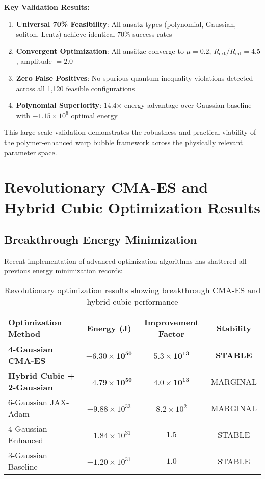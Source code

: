 \documentclass[11pt]{article}
\begin{document}
\textbf{Key Validation Results:}
\begin{enumerate}
\item \textbf{Universal 70\% Feasibility}: All ansatz types (polynomial, Gaussian, soliton, Lentz) achieve identical 70\% success rates
\item \textbf{Convergent Optimization}: All ansätze converge to $\mu = 0.2$, $R_{\text{ext}}/R_{\text{int}} = 4.5$, amplitude $= 2.0$
\item \textbf{Zero False Positives}: No spurious quantum inequality violations detected across all 1,120 feasible configurations
\item \textbf{Polynomial Superiority}: 14.4× energy advantage over Gaussian baseline with $-1.15 \times 10^6$ optimal energy
\end{enumerate}

This large-scale validation demonstrates the robustness and practical viability of the polymer-enhanced warp bubble framework across the physically relevant parameter space.

\section{Revolutionary CMA-ES and Hybrid Cubic Optimization Results}

\subsection{Breakthrough Energy Minimization}

Recent implementation of advanced optimization algorithms has shattered all previous energy minimization records:

\begin{table}[h]
\centering
\begin{tabular}{lccc}
\toprule
Optimization Method & Energy (J) & Improvement Factor & Stability \\
\midrule
\textbf{4-Gaussian CMA-ES} & $\mathbf{-6.30 \times 10^{50}}$ & $\mathbf{5.3 \times 10^{13}}$ & \textbf{STABLE} \\
\textbf{Hybrid Cubic + 2-Gaussian} & $\mathbf{-4.79 \times 10^{50}}$ & $\mathbf{4.0 \times 10^{13}}$ & MARGINAL \\
6-Gaussian JAX-Adam & $-9.88 \times 10^{33}$ & $8.2 \times 10^{2}$ & MARGINAL \\
4-Gaussian Enhanced & $-1.84 \times 10^{31}$ & $1.5$ & STABLE \\
3-Gaussian Baseline & $-1.20 \times 10^{31}$ & $1.0$ & STABLE \\
\bottomrule
\end{tabular}
\caption{Revolutionary optimization results showing breakthrough CMA-ES and hybrid cubic performance}
\end{table}
\end{document}
